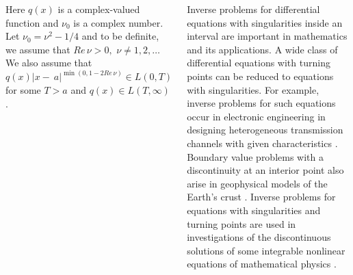 \documentclass[blockverticalspace=20mm,colspace=20mm,25pt]{tikzposter} %
\begin{document}
\begin{columns}
{Here $q(x)$ is a complex-valued function and $\nu_0$ is a complex number. Let $\nu_0=\nu^2-1/4$ and to be definite, we assume that  $Re\,\nu>0,$ $\nu\neq 1,2,\ldots$ 
We also assume that $q(x)|x-~a|^{\min(0,1-2Re\,\nu)} \in L(0,T)$ for some $T>a$ and $q(x)\in L(T,\infty)$. 


Inverse problems for differential equations with singularities inside an 
interval are important in mathematics and its applications. A wide class of differential
equations with turning points can be reduced to equations with singularities. For example, inverse
problems for such equations occur in electronic engineering in designing heterogeneous transmission
channels with given characteristics \cite{yurko-freiling-99}. Boundary value problems with a discontinuity at an interior
point also arise in geophysical models of the Earth's crust \cite{lapwood81}. Inverse problems for equations
with singularities and turning points are used in investigations of the discontinuous solutions of
some integrable nonlinear equations of mathematical physics \cite{const98}. 

}




\end{columns}
\end{document}
